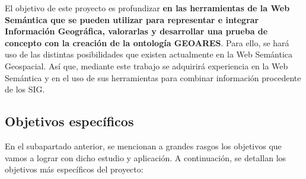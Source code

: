 El objetivo de este proyecto es profundizar \textbf{en las herramientas de la Web Semántica que se pueden utilizar para representar e integrar Información Geográfica, valorarlas y desarrollar una prueba de concepto con la creación de la ontología GEOARES}. Para ello, se hará uso de las distintas posibilidades que existen actualmente en la Web Semántica Geospacial. Así que, mediante este trabajo se adquirirá experiencia en la Web Semántica y en el uso de sus herramientas para combinar información procedente de los SIG.

\subsection{Objetivos específicos}
\label{ch:objetivos}



En el subapartado anterior, se mencionan a grandes rasgos los objetivos que vamos a lograr con dicho estudio y aplicación. A continuación, se detallan los objetivos más específicos del proyecto:

